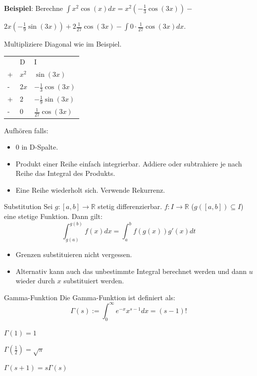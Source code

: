 \documentclass[a4paper,10pt]{article}
\begin{document}
\textbf{Beispiel}: Berechne $\int x^2 \cos(x) dx = x^2 (-\frac{1}{3}\cos(3x)) - $

$2x(-\frac{1}{9}\sin(3x)) + 2\frac{1}{27}\cos(3x) - \int 0 \cdot \frac{1}{27} \cos(3x) dx$.

Multipliziere Diagonal wie im Beispiel.

\begin{table}[h]
	\begin{tabular}{lll}
		  & D     & I                      \\
		+ & $x^2$ & $\sin(3x)$             \\
		- & $2x$  & $-\frac{1}{3}\cos(3x)$ \\
		+ & $2$   & $-\frac{1}{9}\sin(3x)$ \\
		- & $0$   & $\frac{1}{27}\cos(3x)$
	\end{tabular}
\end{table}

Aufhören falls:
\begin{itemize}
	\item $0$ in D-Spalte.
	\item Produkt einer Reihe einfach integrierbar. Addiere oder subtrahiere je nach Reihe das Integral des Produkts.
	\item Eine Reihe wiederholt sich. Verwende Rekurrenz.
\end{itemize}

\begin{mainbox}{Substitution}
	Sei $g: [a, b] \to \mathbb{R}$ stetig differenzierbar. $f: I \to \mathbb{R}$ ($g([a, b]) \subseteq I$) eine stetige Funktion. Dann gilt:
	$$\int_{g(a)}^{g(b)} f(x)dx = \int_{a}^{b} f(g(x))g'(x)dt$$
\end{mainbox}

\begin{itemize}
	\item Grenzen substituieren nicht vergessen.
	\item Alternativ kann auch das unbestimmte Integral berechnet werden und dann $u$ wieder durch $x$ substituiert werden.
\end{itemize}

\begin{subbox}{Gamma-Funktion}
	Die Gamma-Funktion ist definiert als:
	$$\Gamma(s) := \int_0^\infty e^{-x}x^{s-1} dx = (s-1)!$$
	\begin{rowlist}
		\item $\Gamma(1) = 1$
		\item $\Gamma(\frac{1}{2}) = \sqrt{\pi}$
		\item $\Gamma(s + 1) = s \Gamma(s)$
	\end{rowlist}
\end{subbox}
\end{document}
